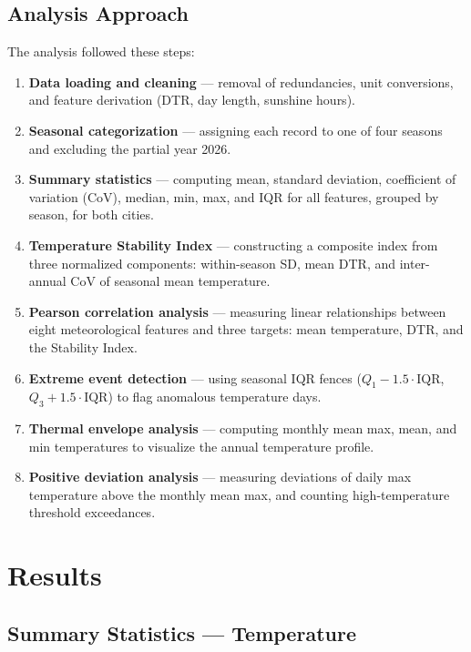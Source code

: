 \documentclass[11pt,a4paper]{article}
\begin{document}
\subsection{Analysis Approach}

The analysis followed these steps:

\begin{enumerate}
  \item \textbf{Data loading and cleaning} — removal of redundancies, unit conversions, and feature derivation (DTR, day length, sunshine hours).
  \item \textbf{Seasonal categorization} — assigning each record to one of four seasons and excluding the partial year 2026.
  \item \textbf{Summary statistics} — computing mean, standard deviation, coefficient of variation (CoV), median, min, max, and IQR for all features, grouped by season, for both cities.
  \item \textbf{Temperature Stability Index} — constructing a composite index from three normalized components: within-season SD, mean DTR, and inter-annual CoV of seasonal mean temperature.
  \item \textbf{Pearson correlation analysis} — measuring linear relationships between eight meteorological features and three targets: mean temperature, DTR, and the Stability Index.
  \item \textbf{Extreme event detection} — using seasonal IQR fences ($Q_1 - 1.5 \cdot \text{IQR}$, $Q_3 + 1.5 \cdot \text{IQR}$) to flag anomalous temperature days.
  \item \textbf{Thermal envelope analysis} — computing monthly mean max, mean, and min temperatures to visualize the annual temperature profile.
  \item \textbf{Positive deviation analysis} — measuring deviations of daily max temperature above the monthly mean max, and counting high-temperature threshold exceedances.
\end{enumerate}

\section{Results}

\subsection{Summary Statistics — Temperature}
\end{document}
